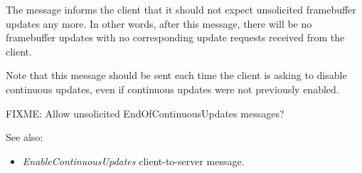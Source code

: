\documentclass[a4paper]{article}
\newcommand{\typestr}[1]{\textit{#1}}
\begin{document}
The message informs the client that it should not expect unsolicited
framebuffer updates any more. In other words, after this message,
there will be no framebuffer updates with no corresponding update
requests received from the client.

Note that this message should be sent each time the client is asking
to disable continuous updates, even if continuous updates were not
previously enabled.

FIXME: Allow unsolicited EndOfContinuousUpdates messages?

See also:
\begin{itemize}
\item \typestr{EnableContinuousUpdates} client-to-server message.
\end{itemize}
\end{document}
